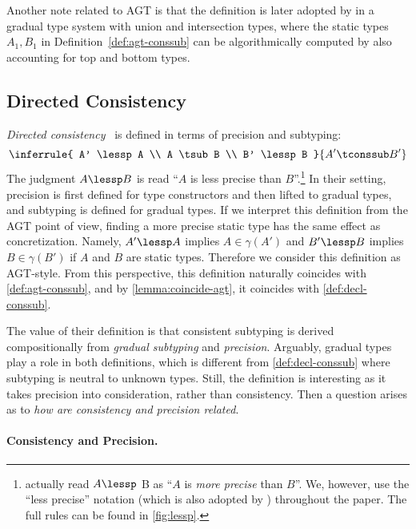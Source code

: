 Another note related to AGT is that the definition is later adopted by
\citet{castagna2017gradual} in a gradual type system with union and intersection
types, where the static types $A_1, B_1$ in Definition~\ref{def:agt-conssub} can
be algorithmically computed by also accounting for top and bottom types.

\subsection{Directed Consistency}


\emph{Directed consistency}~\citep{Jafery:2017:SUR:3093333.3009865} is defined
in terms of precision and subtyping:
\[
  \inferrule{
       A' \lessp A
    \\ A \tsub B
    \\ B' \lessp B
  }{
    A' \tconssub B'
  }
\]
The judgment $A \lessp B$ is read ``$A$ is less precise than $B$''.\footnote{\citeauthor{Jafery:2017:SUR:3093333.3009865} actually read  $A \lessp$ B as ``$A$ is \emph{more precise} than $B$''. We, however, use the ``less precise'' notation (which is also adopted by \citet{cimini2016gradualizer} ) throughout the paper. The full rules can be found in \cref{fig:lessp}.}
In their setting,
precision is first defined for type constructors and then lifted to gradual
types, and subtyping is defined for gradual types. If we interpret this
definition from the AGT point of view, finding a more precise static type
has the same effect as concretization. Namely, $A' \lessp A $ implies $A \in
\gamma(A')$ and $B' \lessp B$ implies $B \in \gamma(B')$ if $A $ and $ B$ are static
types. Therefore we consider this definition as AGT-style. From this
perspective, this definition naturally coincides with \cref{def:agt-conssub},
and by \cref{lemma:coincide-agt}, it coincides with \cref{def:decl-conssub}.

The value of their definition is that consistent subtyping is derived
compositionally from \emph{gradual subtyping} and \emph{precision}.
Arguably, gradual types play a role in both definitions, which is different from
\cref{def:decl-conssub} where subtyping is neutral to unknown types. Still, the
definition is interesting as it takes precision into consideration, rather than
consistency. Then a question arises as to \emph{how are consistency and
  precision related}.

\paragraph{Consistency and Precision.}

